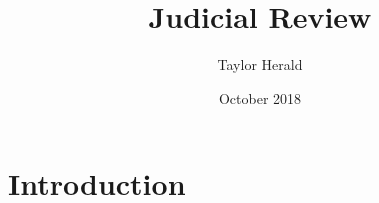 \documentclass{article}
\title{Judicial Review}
\author{Taylor Herald}
\date{October 2018}
\begin{document}
\maketitle

\section{Introduction}
\end{document}

